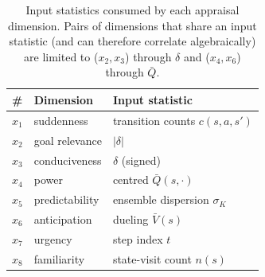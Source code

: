 \documentclass[conference]{IEEEtran}
\begin{document}
\begin{table}[!t]
\centering
\small
\setlength{\tabcolsep}{3pt}
\renewcommand{\arraystretch}{1.05}
\caption{Input statistics consumed by each appraisal dimension.
Pairs of dimensions that share an input statistic (and can therefore correlate
algebraically) are limited to ($x_{2}, x_{3}$) through $\delta$ and
($x_{4}, x_{6}$) through $\bar Q$.}
\label{tab:inputs}
\begin{tabular}{ll l}
\toprule
\# & Dimension & Input statistic \\
\midrule
$x_{1}$ & suddenness     & transition counts $c(s,a,s')$ \\
$x_{2}$ & goal relevance & $|\delta|$ \\
$x_{3}$ & conduciveness  & $\delta$ (signed) \\
$x_{4}$ & power          & centred $\bar Q(s,\cdot)$ \\
$x_{5}$ & predictability & ensemble dispersion $\sigma_{K}$ \\
$x_{6}$ & anticipation   & dueling $\bar V(s)$ \\
$x_{7}$ & urgency        & step index $t$ \\
$x_{8}$ & familiarity    & state-visit count $n(s)$ \\
\bottomrule
\end{tabular}
\end{table}
\end{document}
